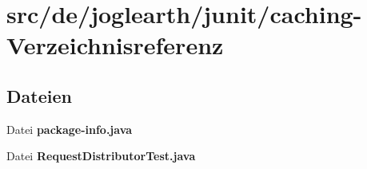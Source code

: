 \section{src/de/joglearth/junit/caching-\/\-Verzeichnisreferenz}
\label{dir_cdcf4a850f1d66d82abb08d0eed030a3}
\subsection*{Dateien}
\begin{DoxyCompactItemize}
\item 
Datei {\bfseries package-\/info.\-java}
\item 
Datei {\bfseries Request\-Distributor\-Test.\-java}
\end{DoxyCompactItemize}
